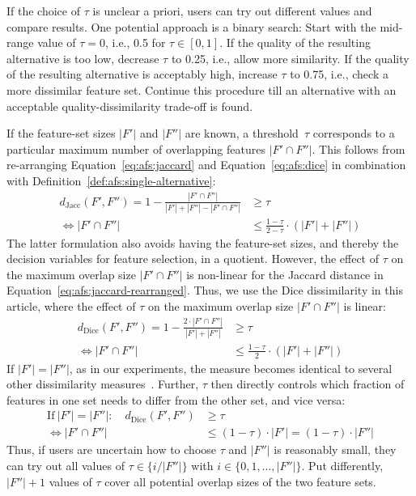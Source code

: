 \documentclass{article}
\theoremstyle{definition}
\begin{document}
If the choice of $\tau$ is unclear a priori, users can try out different values and compare results.
One potential approach is a binary search:
Start with the mid-range value of $\tau=0$, i.e., 0.5 for $\tau \in [0,1]$.
If the quality of the resulting alternative is too low, decrease $\tau$ to 0.25, i.e., allow more similarity.
If the quality of the resulting alternative is acceptably high, increase $\tau$ to 0.75, i.e., check a more dissimilar feature set.
Continue this procedure till an alternative with an acceptable quality-dissimilarity trade-off is found.

If the feature-set sizes $|F'|$ and $|F''|$ are known, a threshold~$\tau$ corresponds to a particular maximum number of overlapping features $|F' \cap F''|$.
This follows from re-arranging Equation~\ref{eq:afs:jaccard} and Equation~\ref{eq:afs:dice} in combination with Definition~\ref{def:afs:single-alternative}:
%
\begin{equation}
	\begin{aligned}
		d_{\text{Jacc}}(F',F'') = 1 - \frac{|F' \cap F''|}{|F'| + |F''| - |F' \cap F''|} &\geq \tau \\
		\Leftrightarrow |F' \cap F''| &\leq \frac{1 - \tau}{2 - \tau} \cdot (|F'| + |F''|)
		\end{aligned}
	\label{eq:afs:jaccard-rearranged}
\end{equation}
%
The latter formulation also avoids having the feature-set sizes, and thereby the decision variables for feature selection, in a quotient.
However, the effect of $\tau$ on the maximum overlap size $|F' \cap F''|$ is non-linear for the Jaccard distance in Equation~\ref{eq:afs:jaccard-rearranged}.
Thus, we use the Dice dissimilarity in this article, where the effect of $\tau$ on the maximum overlap size $|F' \cap F''|$ is linear:
%
\begin{equation}
	\begin{aligned}
		d_{\text{Dice}}(F',F'') = 1 - \frac{2 \cdot |F' \cap F''|}{|F'| + |F''|} &\geq \tau \\
		\Leftrightarrow |F' \cap F''| &\leq \frac{1 - \tau}{2} \cdot (|F'| + |F''|)
	\end{aligned}
	\label{eq:afs:dice-rearranged}
\end{equation}
%
If $|F'| = |F''|$, as in our experiments, the measure becomes identical to several other dissimilarity measures~\cite{egghe2009new}.
Further, $\tau$ then directly controls which fraction of features in one set needs to differ from the other set, and vice versa:
%
\begin{equation}
	\begin{aligned}
		\text{If}~|F'| = |F''|: \quad d_{\text{Dice}}(F',F'') &\geq \tau \\
		\Leftrightarrow |F' \cap F''| &\leq (1 - \tau) \cdot |F'| = (1 - \tau) \cdot |F''|
	\end{aligned}
	\label{eq:afs:dice-rearranged-equal-size}
\end{equation}
%
Thus, if users are uncertain how to choose $\tau$ and $|F''|$ is reasonably small, they can try out all values of $\tau \in \{i / |F''|\}$ with $i \in \{0, 1, \dots, |F''|\}$.
Put differently, $|F''| + 1$ values of $\tau$ cover all potential overlap sizes of the two feature sets.
\end{document}

